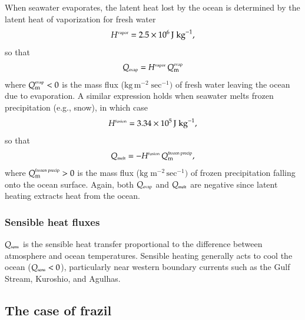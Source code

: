 When seawater evaporates, the latent heat lost by the ocean is
determined by the latent heat of vaporization for fresh water
  \begin{equation}
  H^{\mbox{\tiny vapor}} = 2.5 \times 10^{6} \, \mbox{J} \; \mbox{kg}^{-1},
\label{eq:latent-heat-vapor}
\end{equation}
so that 
\begin{equation}
  Q_{\mbox{\tiny evap}}  =  H^{\mbox{\tiny vapor}} \,  Q_{\mbox{\scriptsize m}}^{\mbox{\tiny evap}}
\end{equation}
where $Q_{\mbox{\scriptsize m}}^{\mbox{\tiny evap}} < 0$ is the mass flux ($\mbox{kg} \,
\mbox{m}^{-2} \; \mbox{sec}^{-1})$ of fresh water leaving the ocean
due to evaporation. A similar expression holds when seawater melts
frozen precipitation (e.g., snow), in which case
\begin{equation}
  H^{\mbox{\tiny fusion}} = 3.34 \times 10^{5} \, \mbox{J} \; \mbox{kg}^{-1},
\label{eq:latent-heat-fusion}
\end{equation}
 so that 
\begin{equation}
  Q_{\mbox{\tiny melt}}  =  -H^{\mbox{\tiny fusion}} \,  Q_{\mbox{\scriptsize m}}^{\mbox{\tiny frozen precip}},
\end{equation}
where $Q_{\mbox{\scriptsize m}}^{\mbox{\tiny frozen precip}} > 0$ is the mass flux
($\mbox{kg} \; \mbox{m}^{-2} \, \mbox{sec}^{-1})$ of frozen
precipitation falling onto the ocean surface. Again, both
$Q_{\mbox{\tiny evap}}$ and $Q_{\mbox{\tiny melt}}$ are negative since
latent heating extracts heat from the ocean.


\subsubsection{Sensible heat fluxes}

$Q_{\mbox{\tiny sens}}$ is the sensible heat transfer proportional to
the difference between atmosphere and ocean temperatures. Sensible
heating generally acts to cool the ocean ($Q_{\mbox{\tiny sens}} <
0$), particularly near western boundary currents such as the Gulf
Stream, Kuroshio, and Agulhas.


\subsection{The case of frazil}
\label{subsection:frazil-and-kpp}

